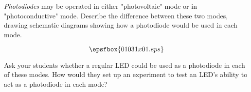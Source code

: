 

{\it Photodiodes} may be operated in either "photovoltaic" mode or in "photoconductive" mode.  Describe the difference between these two modes, drawing schematic diagrams showing how a photodiode would be used in each mode.







$$\epsfbox{01031x01.eps}$$







Ask your students whether a regular LED could be used as a photodiode in each of these modes.  How would they set up an experiment to test an LED's ability to act as a photodiode in each mode?




